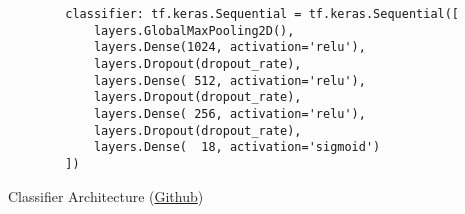 \begin{listing}[H]
    \begin{verbatim}
        classifier: tf.keras.Sequential = tf.keras.Sequential([
            layers.GlobalMaxPooling2D(),
            layers.Dense(1024, activation='relu'),
            layers.Dropout(dropout_rate),
            layers.Dense( 512, activation='relu'),
            layers.Dropout(dropout_rate),
            layers.Dense( 256, activation='relu'),
            layers.Dropout(dropout_rate),
            layers.Dense(  18, activation='sigmoid')
        ])
    \end{verbatim}
\caption{Classifier Architecture (\href{https://github.com/ShenZhouHong/radiography-ai-project/blob/cf8c9e9a1f07849787a98b2fc51df690354bf194/python/common/model.py}{Github})}\label{listing:classifier-def}
\end{listing}